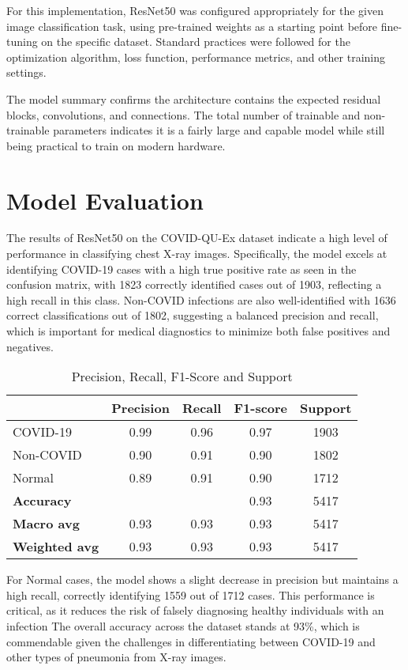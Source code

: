 \documentclass{article}
\begin{document}
For this implementation, ResNet50 was configured appropriately for the given image classification task, using pre-trained weights as a starting point before fine-tuning on the specific dataset. Standard practices were followed for the optimization algorithm, loss function, performance metrics, and other training settings.

The model summary confirms the architecture contains the expected residual blocks, convolutions, and connections. The total number of trainable and non-trainable parameters indicates it is a fairly large and capable model while still being practical to train on modern hardware.
\newpage
\section{Model Evaluation}
The results of ResNet50 on the COVID-QU-Ex dataset indicate a high level of performance in classifying chest X-ray images.
Specifically, the model excels at identifying COVID-19 cases with a high true positive rate as seen in the confusion matrix, with 1823 correctly identified cases out of 1903, reflecting a high recall in this class.
Non-COVID infections are also well-identified with 1636 correct classifications out of 1802, suggesting a balanced precision and recall, which is important for medical diagnostics to minimize both false positives and negatives.
\begin{table}[htbp]
    \centering
    \caption{Precision, Recall, F1-Score and Support}
    \begin{tabular}{lcccc}
        \toprule
        & \textbf{Precision} & \textbf{Recall} & \textbf{F1-score} & \textbf{Support} \\
        \midrule
        COVID-19 & 0.99 & 0.96 & 0.97 & 1903 \\
        Non-COVID & 0.90 & 0.91 & 0.90 & 1802 \\
        Normal & 0.89 & 0.91 & 0.90 & 1712 \\
        \midrule
        \textbf{Accuracy} & & & 0.93 & 5417 \\
        \textbf{Macro avg} & 0.93 & 0.93 & 0.93 & 5417 \\
        \textbf{Weighted avg} & 0.93 & 0.93 & 0.93 & 5417 \\
        \bottomrule
    \end{tabular}
\end{table}

For Normal cases, the model shows a slight decrease in precision but maintains a high recall, correctly identifying 1559 out of 1712 cases. 
This performance is critical, as it reduces the risk of falsely diagnosing healthy individuals with an infection
The overall accuracy across the dataset stands at 93\%, which is commendable given the challenges in differentiating between COVID-19 and other types of pneumonia from X-ray images.
\end{document}
